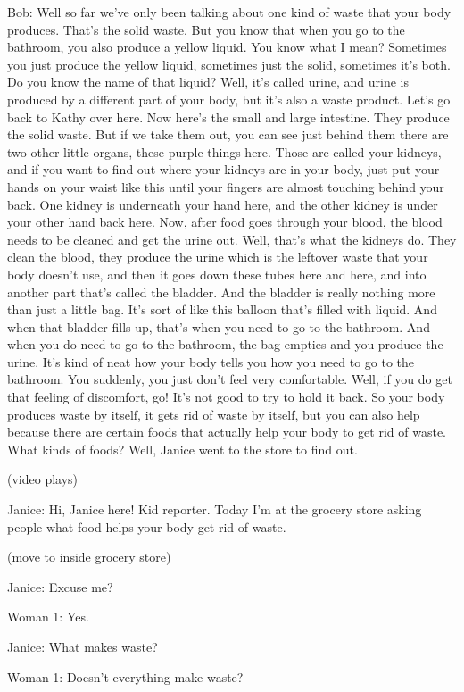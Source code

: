 Bob: Well so far we've only been talking about one kind of waste that your body produces. That's the solid waste. But you know that when you go to the bathroom, you also produce a yellow liquid. You know what I mean? Sometimes you just produce the yellow liquid, sometimes just the solid, sometimes it's both. Do you know the name of that liquid? Well, it's called urine, and urine is produced by a different part of your body, but it's also a waste product. Let's go back to Kathy over here. Now here's the small and large intestine. They produce the solid waste. But if we take them out, you can see just behind them there are two other little organs, these purple things here. Those are called your kidneys, and if you want to find out where your kidneys are in your body, just put your hands on your waist like this until your fingers are almost touching behind your back. One kidney is underneath your hand here, and the other kidney is under your other hand back here. Now, after food goes through your blood, the blood needs to be cleaned and get the urine out. Well, that's what the kidneys do. They clean the blood, they produce the urine which is the leftover waste that your body doesn't use, and then it goes down these tubes here and here, and into another part that's called the bladder. And the bladder is really nothing more than just a little bag. It's sort of like this balloon that's filled with liquid. And when that bladder fills up, that's when you need to go to the bathroom. And when you do need to go to the bathroom, the bag empties and you produce the urine. It's kind of neat how your body tells you how you need to go to the bathroom. You suddenly, you just don't feel very comfortable. Well, if you do get that feeling of discomfort, go! It's not good to try to hold it back. So your body produces waste by itself, it gets rid of waste by itself, but you can also help because there are certain foods that actually help your body to get rid of waste. What kinds of foods? Well, Janice went to the store to find out.

(video plays)

Janice: Hi, Janice here! Kid reporter. Today I'm at the grocery store asking people what food helps your body get rid of waste.

(move to inside grocery store)

Janice: Excuse me?

Woman 1: Yes.

Janice: What makes waste?

Woman 1: Doesn't everything make waste?

